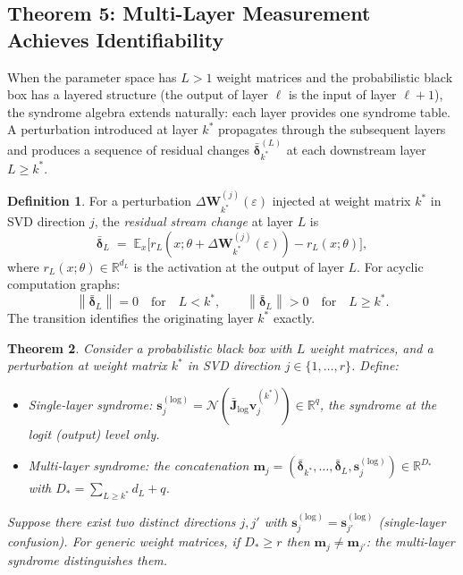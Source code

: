 \documentclass[11pt,a4paper]{article}
\newtheorem{theorem}{Theorem}[section]
\theoremstyle{definition}
\newtheorem{definition}[theorem]{Definition}
\newcommand{\Wm}{\mathbf{W}}
\newcommand{\Jm}{\mathbf{J}}
\newcommand{\vk}[1][]{\mathbf{v}_{#1}}
\newcommand{\sk}[1][]{\mathbf{s}_{#1}}
\newcommand{\Rbb}{\mathbb{R}}
\newcommand{\Nop}{\mathcal{N}}
\newcommand{\Eop}{\mathbb{E}}
\newcommand{\norm}[1]{\left\lVert#1\right\rVert}
\begin{document}
\subsection{Theorem 5: Multi-Layer Measurement Achieves Identifiability}
\label{sec:multi_layer}

When the parameter space has $L > 1$ weight matrices and the probabilistic black box has a layered structure (the output of layer $\ell$ is the input of layer $\ell+1$), the syndrome algebra extends naturally: each layer provides one syndrome table. A perturbation introduced at layer $k^*$ propagates through the subsequent layers and produces a sequence of residual changes $\bar{\boldsymbol{\delta}}^{(L)}_{k^*}$ at each downstream layer $L\geq k^*$.

\begin{defbox}
\begin{definition}
\label{def:causal}
For a perturbation $\Delta\Wm_{k^*}^{(j)}(\varepsilon)$ injected at weight matrix $k^*$ in SVD direction $j$, the \emph{residual stream change} at layer $L$ is
\[
  \bar{\boldsymbol{\delta}}_L \;=\;
  \Eop_x\bigl[ r_L(x;\theta + \Delta\Wm_{k^*}^{(j)}(\varepsilon))
              - r_L(x;\theta) \bigr],
\]
where $r_L(x;\theta) \in \Rbb^{d_L}$ is the activation at the output of layer $L$. For acyclic computation graphs:
\[
  \norm{\bar{\boldsymbol{\delta}}_L} = 0 \quad\text{for}\quad L < k^*,
  \qquad
  \norm{\bar{\boldsymbol{\delta}}_L} > 0 \quad\text{for}\quad L \geq k^* .
\]
The transition identifies the originating layer $k^*$ exactly.
\end{definition}
\end{defbox}

\begin{thmbox}
\begin{theorem}
\label{thm:multilayer}
Consider a probabilistic black box with $L$ weight matrices, and a perturbation at weight matrix $k^*$ in SVD direction $j\in\{1,\ldots,r\}$. Define:
\begin{itemize}[nosep]
  \item \emph{Single-layer syndrome:} $\sk[j]^{(\mathrm{log})} = \Nop(\bar{\Jm}_{\mathrm{log}}\vk[j]^{(k^*)}) \in \Rbb^q$, the syndrome at the logit (output) level only.
  \item \emph{Multi-layer syndrome:} the concatenation $\mathbf{m}_j = (\bar{\boldsymbol{\delta}}_{k^*}, \ldots, \bar{\boldsymbol{\delta}}_L, \sk[j]^{(\mathrm{log})}) \in \Rbb^{D_*}$ with $D_* = \sum_{L\geq k^*} d_L + q$.
\end{itemize}
Suppose there exist two distinct directions $j, j'$ with $\sk[j]^{(\mathrm{log})} = \sk[j']^{(\mathrm{log})}$ (single-layer confusion). For generic weight matrices, if $D_* \geq r$ then $\mathbf{m}_j \neq \mathbf{m}_{j'}$: the multi-layer syndrome distinguishes them.
\end{theorem}
\end{thmbox}
\end{document}
